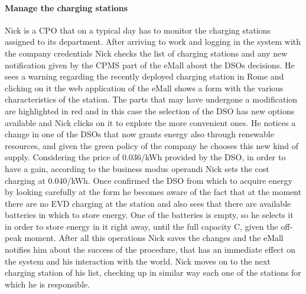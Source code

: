 \paragraph{Manage the charging stations}
Nick is a CPO that on a typical day has to monitor the charging stations assigned to its department. After arriving to work and logging in the system with the company credentials Nick checks the list of charging stations and any new notification given by the CPMS part of the eMall about the DSOs decisions. He sees a warning regarding the recently deployed charging station in Rome and clicking on it the web application of the eMall shows a form with the various characteristics of the station. The parts that may have undergone a modification are highlighted in red and in this case the selection of the DSO has new options available and Nick clicks on it to explore the more convenient ones. He notices a change in one of the DSOs that now grants energy also through renewable resources, and given the green policy of the company he chooses this new kind of supply. Considering the price of 0.036/kWh provided by the DSO, in order to have a gain, according to the business modus operandi Nick sets the cost charging at 0.040/kWh. Once confirmed the DSO from which to acquire energy by looking carefully at the form he becomes aware of the fact that at the moment there are no EVD charging at the station and also sees that there are available batteries in which to store energy. One of the batteries is empty, so he selects it in order to store energy in it right away, until the full capacity C, given the off-peak moment. After all this operations Nick saves the changes and the eMall notifies him about the success of the procedure, that has an immediate effect on the system and his interaction with the world. Nick moves on to the next charging station of his list, checking up in similar way each one of the stations for which he is responsible. 

